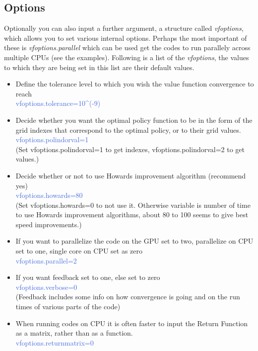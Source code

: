 \subsection{Options}
Optionally you can also input a further argument, a structure called \textit{vfoptions}, which allows you to set various internal options. Perhaps
the most important of these is \textit{vfoptions.parallel} which can be used get the codes to run parallely across multiple CPUs (see the examples).
Following is a list of the \textit{vfoptions}, the values to which they are being set in this list are their default values.
 \begin{itemize}
 \item Define the tolerance level to which you wish the value function convergence to reach \\
    \textcolor{RoyalBlue}{vfoptions.tolerance=10\^{}(-9)}
  \item Decide whether you want the optimal policy function to be in the form of the grid indexes that correspond to the optimal policy, or to their grid values. \\
    \textcolor{RoyalBlue}{vfoptions.polindorval=1} \\
      (Set vfoptions.polindorval=1 to get indexes, vfoptions.polindorval=2 to get values.)
  \item Decide whether or not to use Howards improvement algorithm (recommend yes) \\
    \textcolor{RoyalBlue}{vfoptions.howards=80} \\
      (Set vfoptions.howards=0 to not use it. Otherwise variable is number of time to use Howards improvement algorithms, about 80 to 100
      seems to give best speed improvements.)
  \item If you want to parallelize the code on the GPU set to two, parallelize on CPU set to one, single core on CPU set as zero \\
    \textcolor{RoyalBlue}{vfoptions.parallel=2}
  \item If you want feedback set to one, else set to zero \\
    \textcolor{RoyalBlue}{vfoptions.verbose=0} \\
      (Feedback includes some info on how convergence is going and on the run times of various parts of the code)
  \item When running codes on CPU it is often faster to input the Return Function as a matrix, rather than as a function. \\
    \textcolor{RoyalBlue}{vfoptions.returnmatrix=0} \\

\end{itemize}

